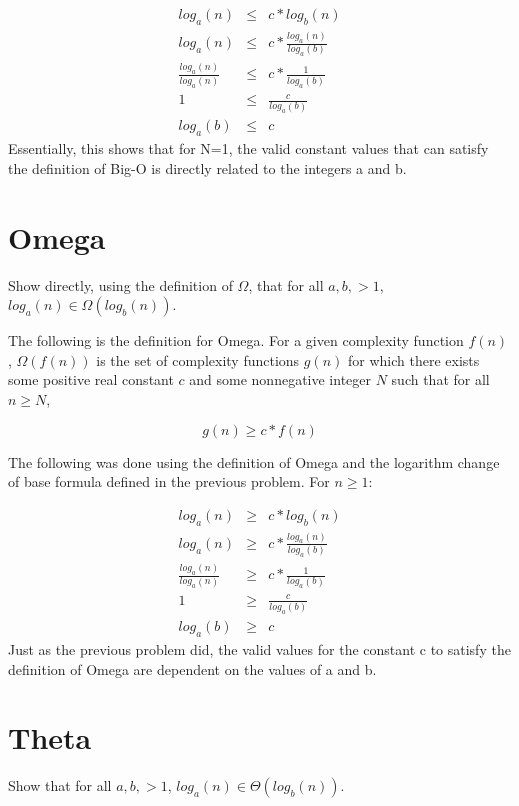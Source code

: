 \documentclass[11pt]{article}
\begin{document}
\begin{eqnarray*}
log_a(n) &\leq& c*log_b(n) \\
log_a(n) &\leq& c*\frac{log_a(n)}{log_a(b)} \\
\frac{log_a(n)}{log_a(n)} &\leq& c*\frac{1}{log_a(b)} \\
1 &\leq& \frac{c}{log_a(b)} \\
log_a(b) &\leq& c
\end{eqnarray*}
Essentially, this shows that for N=1, the valid constant values that can satisfy the definition of Big-O is directly related to the integers a and b.


\section{Omega}
Show directly, using the definition of $\Omega$, that for all $a,b, >1$,  $log_a(n) \in \Omega(log_b(n))$.

\bigskip
\bigskip
The following is the definition for Omega. For a given complexity function $f(n)$, $\Omega(f(n))$ is the set of complexity functions $g(n)$ for which there exists some positive real constant $c$ and some nonnegative integer $N$ such that for all $n \geq N$,

\begin{equation*}
g(n) \geq c * f(n)
\end{equation*}

\bigskip
\bigskip
The following was done using the definition of Omega and the logarithm change of base formula defined in the previous problem. For $n \geq 1$:

\begin{eqnarray*}
log_a(n) &\geq& c*log_b(n) \\
log_a(n) &\geq& c*\frac{log_a(n)}{log_a(b)} \\
\frac{log_a(n)}{log_a(n)} &\geq& c*\frac{1}{log_a(b)} \\
1 &\geq& \frac{c}{log_a(b)} \\
log_a(b) &\geq& c
\end{eqnarray*}
Just as the previous problem did, the valid values for the constant c to satisfy the definition of Omega are dependent on the values of a and b.


\section{Theta}
Show that for all $a,b, >1$,  $log_a(n) \in \Theta(log_b(n))$.
\end{document}
